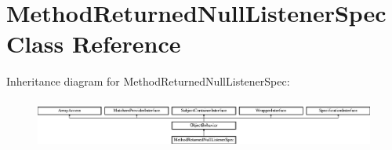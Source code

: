 \section{Method\+Returned\+Null\+Listener\+Spec Class Reference}
\label{classspec_1_1_php_spec_1_1_listener_1_1_method_returned_null_listener_spec}
Inheritance diagram for Method\+Returned\+Null\+Listener\+Spec\+:\begin{figure}[H]
\begin{center}
\leavevmode
\includegraphics[height=1.607656cm]{classspec_1_1_php_spec_1_1_listener_1_1_method_returned_null_listener_spec}
\end{center}
\end{figure}
